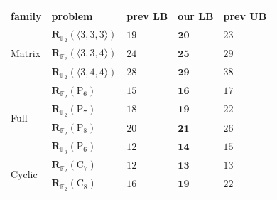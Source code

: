 \documentclass[11pt]{article}
\theoremstyle{definition}
\newcommand{\F}{\mathbb{F}}
\newcommand{\Rk}[2]{\mathbf{R}_{#1}(#2)}
\newcommand{\Cyct}[1]{\mathrm{C}_{#1}}
\newcommand{\Fullt}[1]{\mathrm{P}_{#1}}
\newcommand{\mmt}[3]{\langle #1,#2,#3\rangle}
\begin{document}
\begin{table}[!ht]
  \centering
  \small
  \setlength{\tabcolsep}{10pt}
  \begin{tabular}{lllll}
    \toprule
    family & problem                    & prev LB                                                                       & \textbf{our LB}        & prev UB                                                      \\
    \midrule
    \multirow{3}{*}{Matrix}
    & $\Rk{\F_2}{\mmt{3}{3}{3}}$ & $19$~\cite{blaser2003complexity}                                              & $\mathbf{20}$ & $23$~\cite{laderman1976noncommutative}                       \\
    & $\Rk{\F_2}{\mmt{3}{3}{4}}$ & $24$~\cite{blaser2003complexity}                                              & $\mathbf{25}$ & $29$~\cite{smirnov2013bilinear}                              \\
    & $\Rk{\F_2}{\mmt{3}{4}{4}}$ & $28$~\cite{blaser1999lower}                                                   & $\mathbf{29}$ & $38$~\cite{smirnov2013bilinear}                              \\
    \midrule
    \multirow{4}{*}{Full}
    & $\Rk{\F_2}{\Fullt{6}}$     & $15$~\cite{lempel1977new,brockett1978optimal,grassl2007codetables} & $\mathbf{16}$ & $17$~\cite{montgomery2005five}                               \\
    & $\Rk{\F_2}{\Fullt{7}}$     & $18$~\cite{lempel1977new,brockett1978optimal,grassl2007codetables} & $\mathbf{19}$ & $22$~\cite{montgomery2005five}                               \\
    & $\Rk{\F_2}{\Fullt{8}}$     & $20$~\cite{lempel1977new,brockett1978optimal,grassl2007codetables} & $\mathbf{21}$ & $26$~\cite{fan2007comments}                 \\
    & $\Rk{\F_3}{\Fullt{6}}$     & $12$~\cite{lempel1977new,brockett1978optimal,solomon1965algebraically}    & $\mathbf{14}$ & $15$~\cite{barbulescu2012finding}                                 \\
    \midrule
    \multirow{4}{*}{Cyclic}
    & $\Rk{\F_2}{\Cyct{7}}$      & $12$~\cite{degroote1983characterization,blaser2005complete}                   & $\mathbf{13}$ & $13$~\cite{wagh1983structured}                               \\
    & $\Rk{\F_2}{\Cyct{8}}$      & $16$~\cite{averbuch1991classification,blaser2005complete}                     & $\mathbf{19}$ & $22$~\cite{cenk2011multiplication} \\

\end{tabular}
\end{table}
\end{document}
